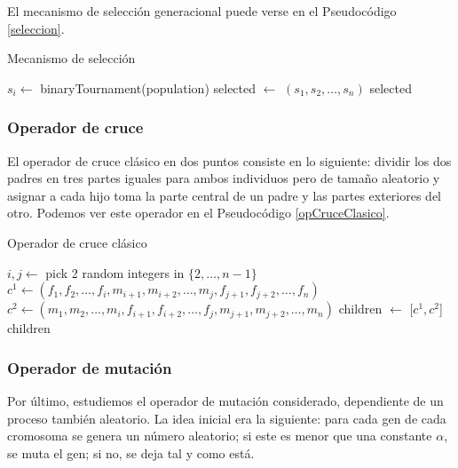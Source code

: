 \documentclass[a4paper, 11pt, titlepage]{article}
\begin{document}
    El mecanismo de selección generacional puede verse en el Pseudocódigo \ref{seleccion}.

    \begin{algorithm}
        \caption{Mecanismo de selección}\label{seleccion}
        \begin{algorithmic}[1]
             
                \State $s_i \gets$ binaryTournament(population)
            \EndFor
            \State selected $\gets$ $(s_1, s_2, \dots, s_{n})$
            \State \Return selected
            \EndFunction
        \end{algorithmic}
    \end{algorithm}

    \subsubsection*{Operador de cruce}

    El operador de cruce clásico en dos puntos consiste en lo siguiente: dividir los dos padres en tres partes iguales para ambos individuos pero de tamaño aleatorio y asignar a cada hijo toma la parte central de un padre y las partes exteriores del otro. Podemos ver este operador en el Pseudocódigo \ref{opCruceClasico}.

    \begin{algorithm}
        \caption{Operador de cruce clásico}\label{opCruceClasico}
        \begin{algorithmic}[1]
             
            \State $i, j \gets$ pick 2 random integers in $\{2,\dots,n-1\}$ 
            \State $c^1 \gets (f_1, f_2, \dots, f_i, m_{i+1}, m_{i+2}, \dots, m_j, f_{j+1}, f_{j+2}, \dots, f_n)$
            \State $c^2 \gets (m_1, m_2, \dots, m_i, f_{i+1}, f_{i+2}, \dots, f_j, m_{j+1}, m_{j+2}, \dots, m_n)$
            \State children $\gets$ [$c^1, c^2$]
            \State \Return children
            \EndFunction
        \end{algorithmic}
    \end{algorithm}

    \subsubsection*{Operador de mutación}

    Por último, estudiemos el operador de mutación considerado, dependiente de un proceso también aleatorio. La idea inicial era la siguiente: para cada gen de cada cromosoma se genera un número aleatorio; si este es menor que una constante $\alpha$, se muta el gen; si no, se deja tal y como está.
\end{document}
